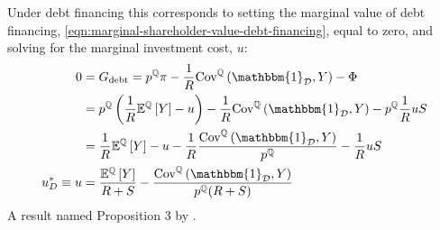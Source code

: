 \documentclass[../main.tex]{subfiles}
\begin{document}
            Under debt financing this corresponds to setting the marginal value of debt financing,
            \cref{eqn:marginal-shareholder-value-debt-financing}, equal to zero,
            and solving for the marginal investment cost, $u$:
                \begin{align}
                    0 &= G_{\text{debt}} 
                    = 
                        p^{\mathbb{Q}}\pi 
                        - 
                        \discountfactor  
                        \text{Cov}^{\mathbb{Q}}\left(\mathbbm{1}_{\mathcal{D}}, Y\right) 
                        - 
                        \Phi
                        \nonumber\\
                    &=
                        p^{\mathbb{Q}} \left(
                            \discountfactor
                            \mathbb{E}^{\mathbb{Q}}\left[Y\right]
                            - u
                        \right)
                        -
                        \discountfactor
                        \text{Cov}^{\mathbb{Q}}\left(\mathbbm{1}_{\mathcal{D}}, Y\right) 
                        - 
                        p^{\mathbb{Q}} \discountfactor u S 
                        \nonumber\\
                    &= 
                        \discountfactor
                        \mathbb{E}^{\mathbb{Q}}\left[Y\right]  
                        - u
                        - 
                        \discountfactor
                        \frac{
                            \text{Cov}^{\mathbb{Q}}\left(\mathbbm{1}_{\mathcal{D}}, Y\right) 
                        }{
                            p^{\mathbb{Q}}
                        }
                        - \discountfactor u S 
                        \nonumber\\
                    u^{\ast}_{D}
                    \equiv
                    u &=
                        \frac{
                            \mathbb{E}^{\mathbb{Q}}\left[Y\right]
                        }{
                            \grossrfrate + S  
                        } 
                        - \frac{
                            \text{Cov}^{\mathbb{Q}}\left(\mathbbm{1}_{\mathcal{D}}, Y\right)
                        }{
                            p^{\mathbb{Q}}(\grossrfrate + S)  
                        } 
                \end{align}
            A result named Proposition 3 by \cite{ADS2019}.
\end{document}
